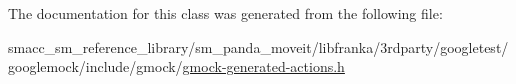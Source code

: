 The documentation for this class was generated from the following file\+:\begin{DoxyCompactItemize}
\item 
smacc\+\_\+sm\+\_\+reference\+\_\+library/sm\+\_\+panda\+\_\+moveit/libfranka/3rdparty/googletest/googlemock/include/gmock/\hyperlink{gmock-generated-actions_8h}{gmock-\/generated-\/actions.\+h}\end{DoxyCompactItemize}
